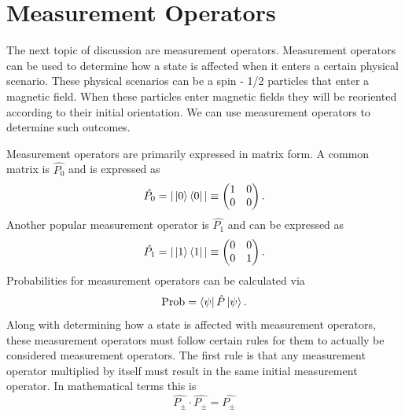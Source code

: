 \documentclass[twocolumn]{article}
\begin{document}
\section*{Measurement Operators}
The next topic of discussion are measurement operators. Measurement operators can be used to determine how a state is affected when it enters a certain physical scenario. These physical scenarios can be a spin - 1/2 particles that enter a magnetic field. When these particles enter magnetic fields they will be reoriented according to their initial orientation. We can use measurement operators to determine such outcomes.

Measurement operators are primarily expressed in matrix form. A common matrix is $\hat{P_0}$ and is expressed as
\begin{equation}
\hat{P_0}=|\ket{0}\bra{0}|\equiv
\begin{pmatrix}
1 & 0 \\
0 & 0
\end{pmatrix}.
\end{equation}
Another popular measurement operator is $\hat{P_1}$ and can be expressed as
\begin{equation}
\hat{P_1}=|\ket{1}\bra{1}|\equiv
\begin{pmatrix}
0 & 0 \\
0 & 1
\end{pmatrix}.
\end{equation}
Probabilities for measurement operators can be calculated via
\begin{equation}
\text{Prob}=\bra{\psi}\hat{P}\ket{\psi}.
\end{equation}
Along with determining how a state is affected with measurement operators, these measurement operators must follow certain rules for them to actually be considered measurement operators. The first rule is that any measurement operator multiplied by itself must result in the same initial measurement operator. In mathematical terms this is
\begin{equation}
\hat{P_{\pm}}\cdot\hat{P_{\pm}}=\hat{P_{\pm}}
\end{equation}
\end{document}

